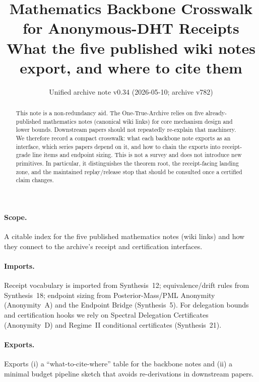 \documentclass[11pt]{article}
\title{Mathematics Backbone Crosswalk for Anonymous-DHT Receipts\\
\large What the five published wiki notes export, and where to cite them}
\author{}
\date{Unified archive note v0.34 (2026-05-10; archive v782)}
\begin{document}
\maketitle

\begin{abstract}
This note is a non-redundancy aid.
The One-True-Archive relies on five already-published mathematics notes (canonical wiki links) for core mechanism design and lower bounds.
Downstream papers should not repeatedly re-explain that machinery.
We therefore record a compact crosswalk: what each backbone note exports as an interface, which series papers depend on it, and how to chain the exports into receipt-grade line items and endpoint sizing.
This is not a survey and does not introduce new primitives.
In particular, it distinguishes the theorem root, the receipt-facing landing zone, and the maintained replay/release stop that should be consulted once a certified claim changes.
\end{abstract}

\paragraph{Scope.}
A citable index for the five published mathematics notes (wiki links) and how they connect to the archive's receipt and certification interfaces.

\paragraph{Imports.}
Receipt vocabulary is imported from Synthesis~12; equivalence/drift rules from Synthesis~18; endpoint sizing from Posterior-Mass/PML Anonymity (Anonymity~A) and the Endpoint Bridge (Synthesis~5).
For delegation bounds and certification hooks we rely on Spectral Delegation Certificates (Anonymity~D) and Regime~II conditional certificates (Synthesis~21).\cite{series:receiptitems,series:planstateequiv,series:oddsinflation,series:endpointbridge,series:spectral2budget,series:condcert}

\paragraph{Exports.}
Exports (i) a ``what-to-cite-where'' table for the backbone notes and (ii) a minimal budget pipeline sketch that avoids re-derivations in downstream papers.
\end{document}
